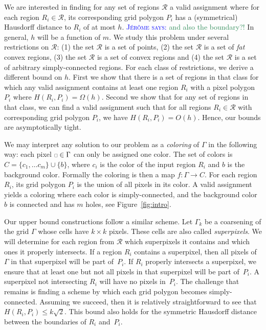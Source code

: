 \documentclass[a4paper,UKenglish,cleveref]{lipics-v2019}
\newcommand{\mremark}[3]{\textcolor{blue}{\textsc{#1 #2:}} \textcolor{SeaGreen}{\textsf{#3}}}
\newcommand{\jerome}[2][says]{\mremark{J\'er\^ome}{#1}{#2}}
\newcommand{\pix}{\scalebox{0.6}{$\square$}}
\begin{document}
We are interested in finding for any set of regions $\mathcal{R}$ a valid assignment where for each region $R_i \in \mathcal{R}$, its corresponding grid polygon $P_i$ has a (symmetrical) Hausdorff distance to $R_i$ of at most $h$.
\jerome{and also the boundary?!}
In general, $h$ will be a function of $m$. We study this problem under several restrictions on $\mathcal{R}$: (1) the set $\mathcal{R}$ is a set of points, (2) the set $\mathcal{R}$ is a set of \emph{fat} convex regions, (3) the set $\mathcal{R}$ is a set of convex regions and (4) the set $\mathcal{R}$ is a set of arbitrary simply-connected regions.
For each class of restrictions, we derive a different bound on $h$. First we show that there is a set of regions in that class for which any valid assignment contains at least one region $R_i$ with a pixel polygon $P_i$ where $H(R_i, P_i) = \Omega(h)$. Second we show that for any set of regions in that class, we can find a valid assignment such that for all regions $R_i \in \mathcal{R}$ with corresponding grid polygon $P_i$, we have $H(R_i, P_i) = O(h)$. Hence, our bounds are asymptotically tight.

We may interpret any solution to our problem as a {\em coloring} of $\Gamma$ in the following way:
each pixel $\pix\in\Gamma$ can only be assigned one color. The set of colors is $C = \{c_1,\dots c_m\}\cup\{b\}$, where $c_i$ is the color of the input region $R_i$ and $b$ is the background color.
Formally the coloring is then a map $f:\Gamma\to C$. For each region $R_i$, its grid polygon $P_i$ is the union of all pixels in its color. A valid assignment yields a coloring where each color is simply-connected, and the background color $b$ is connected and has $m$ holes, see Figure~\ref{fig:intro}.

Our upper bound constructions follow a similar scheme. Let $\Gamma_k$ be a coarsening of the grid $\Gamma$ whose cells have $k\times k$ pixels. These cells are also called \emph{superpixels}. We will determine for each region from $\mathcal{R}$ which superpixels it contains and which ones it properly intersects.
If a region $R_i$ contains a superpixel, then all pixels of $\Gamma$ in that superpixel will be part of~$P_i$. If $R_i$ properly intersects a superpixel, we ensure that at least one but not all pixels in that superpixel will be part of~$P_i$. A superpixel not intersecting $R_i$ will have no pixels in~$P_i$.
The challenge that remains is finding a scheme by which each grid polygon becomes simply-connected. Assuming we succeed, then it is relatively straightforward to see that $H(R_i,P_i) \le k\sqrt{2}$. This bound also holds for the symmetric Hausdorff distance between the boundaries of $R_i$ and~$P_i$.
\end{document}
